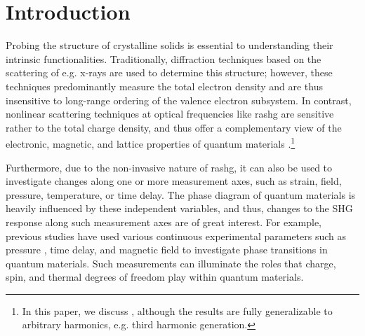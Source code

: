 \section{\label{km-sec:intro} Introduction}

Probing the structure of crystalline solids is essential to understanding their intrinsic functionalities. 
Traditionally, diffraction techniques based on the scattering of e.g. x-rays are used to determine this structure; however, these techniques predominantly measure the total electron density and are thus insensitive to long-range ordering of the valence electron subsystem.
In contrast, nonlinear scattering techniques at optical frequencies like \gls{rashg} are sensitive rather to the total charge density, and thus offer a complementary view of the electronic, magnetic, and lattice properties of quantum materials \citep{Torchinsky2014ASymmetries, Fichera2020SecondSymmetry}.\footnote{In this paper, we discuss , although the results are fully generalizable to arbitrary harmonics, e.g. third harmonic generation.}


Furthermore, due to the non-invasive nature of \gls{rashg}, it can also be used to investigate changes along one or more measurement axes, such as strain, field, pressure, temperature, or time delay.
The phase diagram of quantum materials is heavily influenced by these independent variables, and thus, changes to the SHG response along such measurement axes are of great interest.
For example, previous studies have used various continuous experimental parameters such as pressure \citep{Li2022High-pressureTaAs}, time delay\citep{Shan2021GiantEngineering}, and magnetic field to investigate phase transitions in quantum materials.
Such measurements can illuminate the roles that charge, spin, and thermal degrees of freedom play within quantum materials.

